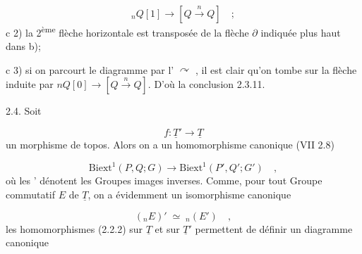 \begin{equation*}
{}_nQ[1] \longrightarrow [Q \xrightarrow{\,n\,} Q] \quad ;
\end{equation*}
c 2)   la 2\textsuperscript{ème} flèche horizontale est transposée de la flèche $\partial$ indiquée plus haut dans b);

c 3)   si on parcourt le diagramme par l' $\curvearrowright$ , il est clair qu'on tombe sur la flèche induite par $nQ[0] \longrightarrow [Q \xrightarrow{\,n\,} Q]$. D'où la conclusion 2.3.11.


2.4.   Soit

\begin{equation*}
f : \underline{T}' \longrightarrow \underline{T}
\end{equation*}
un morphisme de topos. Alors on a un homomorphisme canonique (VII 2.8)

\begin{equation*}
\mathrm{Biext}^1(P,Q;G) \longrightarrow \mathrm{Biext}^1(P',Q';G') \quad ,
\end{equation*}
où les ' dénotent les Groupes images inverses. Comme, pour tout Groupe commutatif $E$ de $\underline{T}$, on a évidemment un isomorphisme canonique

\begin{equation*}
({}_nE)' \;\simeq\; {}_n(E') \quad ,
\end{equation*}
les homomorphismes (2.2.2) sur $\underline{T}$ et sur $\underline{T}'$ permettent de définir un diagramme canonique

